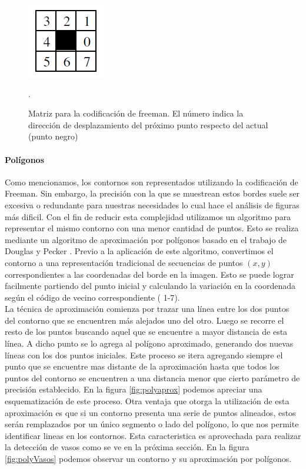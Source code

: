 \begin{figure}[htpb]
\begin{center}
  \includegraphics[scale=0.6]{figuras/freeman-codes.png}
\end{center}
  \caption{\small Matriz para la codificación de freeman. El número indica la dirección de desplazamiento del próximo punto respecto del
  actual (punto negro) }.
  \label{fig:freeman}
\end{figure}
		
		
	\paragraph{Polígonos}
	Como mencionamos, los contornos son representados utilizando la codificación de Freeman. Sin embargo, la precisión con la que se muestrean estos bordes suele ser excesiva o redundante para nuestras
	necesidades lo cual hace el análisis de figuras más dificil. Con el fin de reducir esta complejidad utilizamos un algoritmo
	para representar el mismo contorno con una menor cantidad de puntos. Esto se realiza mediante un algoritmo de aproximación por polígonos
	basado en el trabajo de Douglas y Pecker \cite{dp74}. Previo a la aplicación de este algoritmo, convertimos el contorno a una representación
	tradicional de secuencias de puntos $(x,y)$ correspondientes a las coordenadas del borde en la imagen. Esto se puede lograr facilmente
	partiendo del punto inicial y calculando la variación en la coordenada según el código de vecino correspondiente ( 1-7).\\
	\indent La técnica de aproximación comienza por trazar una línea entre los dos puntos del contorno que se encuentren más alejados uno del otro.
	Luego se recorre el resto de los puntos buscando aquel que se encuentre a mayor distancia de esta línea. A dicho punto se lo agrega al 
	polígono aproximado, generando dos nuevas líneas con los dos puntos iniciales. Este proceso se itera agregando siempre el punto que se 
	encuentre mas distante de la aproximación hasta que todos los puntos del contorno se encuentren a una distancia menor que cierto parámetro 
	de precisión establecido. En la figura \ref{fig:polyaprox} podemos apreciar una esquematización de este proceso. Otra ventaja que 
	otorga la utilización de esta aproximación es que si un contorno presenta una serie de puntos alineados, estos serán remplazados por un 
	único segmento o lado del polígono, lo que nos permite identificar lineas en los contornos. Esta caracteristica es aprovechada para
	realizar la detección de vasos como se ve en la próxima sección. En la figura \ref{fig:polyVasos} podemos observar un contorno
	y su aproximación por polígonos.
	
